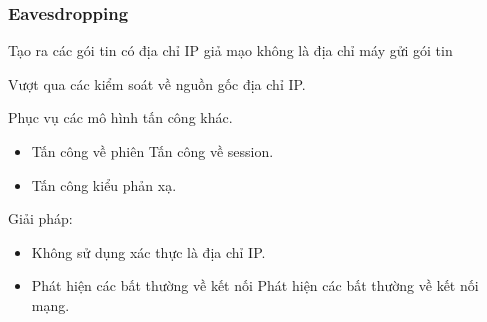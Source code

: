 \documentclass{beamer}
\begin{document}
\begin{frame}
\frametitle{Eavesdropping}
	\begin{block}{}
		Tạo ra các gói tin có địa chỉ IP giả mạo không là địa chỉ máy gửi gói tin
	\end{block}
	\begin{block}{}
		Vượt qua các kiểm soát về nguồn gốc địa chỉ IP.
	\end{block}
	\begin{block}{}
			Phục vụ các mô hình tấn công khác.
			\begin{itemize}
                \item Tấn công về phiên Tấn công về session.
                \item Tấn công kiểu phản xạ.
            \end{itemize}
	\end{block}
	\begin{block}{}
		Giải pháp:
			\begin{itemize}
                \item Không sử dụng xác thực là địa chỉ IP.
                \item Phát hiện các bất thường về kết nối Phát hiện các bất thường về kết nối mạng.
            \end{itemize}
	\end{block}
\end{frame}
\end{document}
